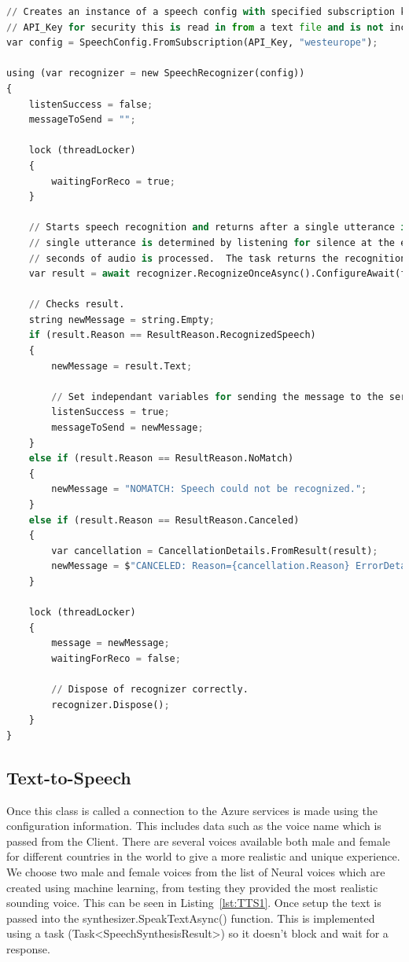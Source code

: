 \newpage
\begin{lstlisting}[caption={Speech To Text - Setup and request},label={lst:STT},language=python]
// Creates an instance of a speech config with specified subscription key and service region.
// API_Key for security this is read in from a text file and is not included on Github. 
var config = SpeechConfig.FromSubscription(API_Key, "westeurope");

using (var recognizer = new SpeechRecognizer(config))
{
    listenSuccess = false;
    messageToSend = "";

    lock (threadLocker)
    {
        waitingForReco = true;
    }

    // Starts speech recognition and returns after a single utterance is recognized. The end of a
    // single utterance is determined by listening for silence at the end or until a maximum of 15
    // seconds of audio is processed.  The task returns the recognition text as result.
    var result = await recognizer.RecognizeOnceAsync().ConfigureAwait(false);

    // Checks result.
    string newMessage = string.Empty;
    if (result.Reason == ResultReason.RecognizedSpeech)
    {
        newMessage = result.Text;

        // Set independant variables for sending the message to the server.
        listenSuccess = true;
        messageToSend = newMessage;
    }
    else if (result.Reason == ResultReason.NoMatch)
    {
        newMessage = "NOMATCH: Speech could not be recognized.";
    }
    else if (result.Reason == ResultReason.Canceled)
    {
        var cancellation = CancellationDetails.FromResult(result);
        newMessage = $"CANCELED: Reason={cancellation.Reason} ErrorDetails={cancellation.ErrorDetails}";
    }

    lock (threadLocker)
    {
        message = newMessage;
        waitingForReco = false;

        // Dispose of recognizer correctly.
        recognizer.Dispose();
    }
}
\end{lstlisting}

\subsection{Text-to-Speech}
Once this class is called a connection to the Azure services is made using the configuration information. This includes data such as the voice name which is passed from the Client. There are several voices available both male and female for different countries in the world to give a more realistic and unique experience. We choose two male and female voices from the list of Neural voices which are created using machine learning, from testing they provided the most realistic sounding voice. This can be seen in Listing~\ref{lst:TTS1}. Once setup the text is passed into the synthesizer.SpeakTextAsync() function. This is implemented using a task (Task<SpeechSynthesisResult>) so it doesn't block and wait for a response.


